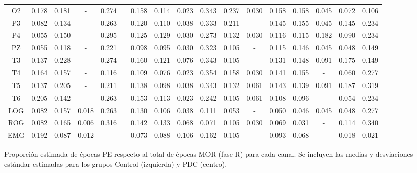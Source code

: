 \begin{SidewaysFigure}
\begin{tabular}{c||ccccc|cc||cccc|cc||ccc}
 O2 & 0.178    & 0.181    & -      & 0.274    && 0.158    & 0.114    & 0.023    & 0.343    & 0.237    & 0.030    & 0.158    & 0.158    & 0.045    & 0.072    & 0.106     \\
 P3 & 0.082    & 0.134    & -      & 0.263    && 0.120    & 0.110    & 0.038    & 0.333    & 0.211    & -      & 0.145    & 0.155    & 0.045    & 0.145    & 0.234     \\
 P4 & 0.055    & 0.150    & -      & 0.295    && 0.125    & 0.129    & 0.030    & 0.273    & 0.132    & 0.030    & 0.116    & 0.115    & 0.182    & 0.090    & 0.234     \\
 PZ & 0.055    & 0.118    & -      & 0.221    && 0.098    & 0.095    & 0.030    & 0.323    & 0.105    & -      & 0.115    & 0.146    & 0.045    & 0.048    & 0.149     \\
 T3 & 0.137    & 0.228    & -      & 0.274    && 0.160    & 0.121    & 0.076    & 0.343    & 0.105    & -      & 0.131    & 0.148    & 0.091    & 0.175    & 0.149     \\
 T4 & 0.164    & 0.157    & -      & 0.116    && 0.109    & 0.076    & 0.023    & 0.354    & 0.158    & 0.030    & 0.141    & 0.155    & -      & 0.060    & 0.277     \\
 T5 & 0.137    & 0.205    & -      & 0.211    && 0.138    & 0.098    & 0.038    & 0.343    & 0.132    & 0.061    & 0.143    & 0.139    & 0.091    & 0.187    & 0.319     \\
 T6 & 0.205    & 0.142    & -      & 0.263    && 0.153    & 0.113    & 0.023    & 0.242    & 0.105    & 0.061    & 0.108    & 0.096    & -      & 0.054    & 0.234     \\
 LOG & 0.082    & 0.157    & 0.018    & 0.263    && 0.130    & 0.106    & 0.038    & 0.111    & 0.053    & -      & 0.050    & 0.046    & 0.045    & 0.048    & 0.277     \\
 ROG & 0.082    & 0.165    & 0.006    & 0.316    && 0.142    & 0.133    & 0.068    & 0.071    & 0.105    & 0.030    & 0.069    & 0.031    & -      & 0.114    & 0.340     \\
 EMG & 0.192    & 0.087    & 0.012    & -      && 0.073    & 0.088    & 0.106    & 0.162    & 0.105    & -      & 0.093    & 0.068    & -      & 0.018    & 0.021     \\
\end{tabular}
\caption{Proporci\'on estimada de \'epocas PE respecto al total de \'epocas MOR 
(fase R) para cada
canal. Se incluyen las medias y desviaciones est\'andar estimadas para los grupos 
Control (izquierda) y PDC (centro).}
\label{gpos_mor}
\end{SidewaysFigure}

